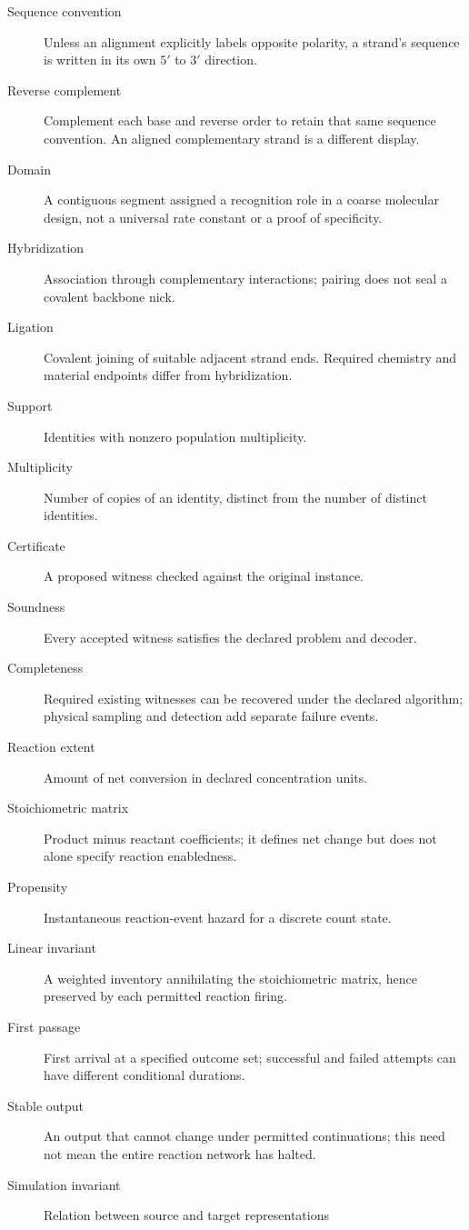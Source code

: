 \begin{description}
\item[Sequence convention] Unless an alignment explicitly labels opposite
polarity, a strand's sequence is written in its own $5'$ to $3'$ direction.
\item[Reverse complement] Complement each base and reverse order to retain that
same sequence convention. An aligned complementary strand is a different display.
\item[Domain] A contiguous segment assigned a recognition role in a coarse
molecular design, not a universal rate constant or a proof of specificity.
\item[Hybridization] Association through complementary interactions; pairing
does not seal a covalent backbone nick.
\item[Ligation] Covalent joining of suitable adjacent strand ends. Required
chemistry and material endpoints differ from hybridization.
\item[Support] Identities with nonzero population multiplicity.
\item[Multiplicity] Number of copies of an identity, distinct from the number
of distinct identities.
\item[Certificate] A proposed witness checked against the original instance.
\item[Soundness] Every accepted witness satisfies the declared problem and decoder.
\item[Completeness] Required existing witnesses can be recovered under the
declared algorithm; physical sampling and detection add separate failure events.
\item[Reaction extent] Amount of net conversion in declared concentration units.
\item[Stoichiometric matrix] Product minus reactant coefficients; it defines
net change but does not alone specify reaction enabledness.
\item[Propensity] Instantaneous reaction-event hazard for a discrete count state.
\item[Linear invariant] A weighted inventory annihilating the stoichiometric
matrix, hence preserved by each permitted reaction firing.
\item[First passage] First arrival at a specified outcome set; successful and
failed attempts can have different conditional durations.
\item[Stable output] An output that cannot change under permitted continuations;
this need not mean the entire reaction network has halted.
\item[Simulation invariant] Relation between source and target representations

\end{description}

